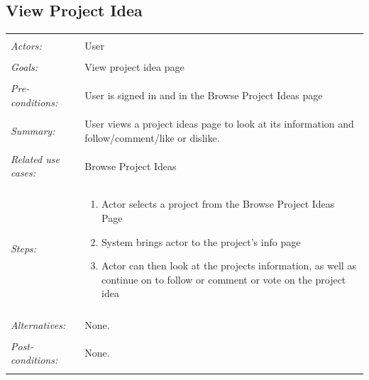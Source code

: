 \documentclass[11pt]{report}
\begin{document}
\subsection{View Project Idea}
\begin{tabular}{ p{2cm} p{12cm} }
 \hline
 \\
 \textit{Actors:} & User \\ 
 \\
 \textit{Goals:} & View project idea page  \\
 \\
 \textit{Pre-conditions:} & User is signed in and in the Browse Project Ideas page  \\
 \\
 \textit{Summary:} &  User views a project ideas page to look at its information and follow/comment/like or dislike. \\ 
 \\
 \textit{Related use cases:} & Browse Project Ideas\\ 
 \\
 \textit{Steps:} & \begin{enumerate}
  \item Actor selects a project from the Browse Project Ideas Page
  \item System brings actor to the project's info page
  \item Actor can then look at the projects information, as well as continue on to follow or comment or vote on the project idea

 \end{enumerate} \\
 \\
 \textit{Alternatives:} & None. \\
 \\
 \textit{Post-conditions:} & None. \\
 \\
\hline
\end{tabular}
\end{document}
